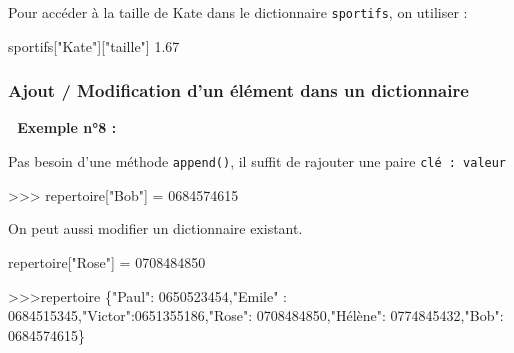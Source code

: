 \documentclass[
]{article}
\newenvironment{Shaded}{}{}
\newcommand{\FloatTok}[1]{\textcolor[rgb]{0.25,0.63,0.44}{#1}}
\newcommand{\NormalTok}[1]{#1}
\newcommand{\OperatorTok}[1]{\textcolor[rgb]{0.40,0.40,0.40}{#1}}
\newcommand{\StringTok}[1]{\textcolor[rgb]{0.25,0.44,0.63}{#1}}
\begin{document}
Pour accéder à la taille de Kate dans le dictionnaire \texttt{sportifs},
on utiliser :

\begin{Shaded}
\begin{Highlighting}[]
\NormalTok{sportifs[}\StringTok{"Kate"}\NormalTok{][}\StringTok{"taille"}\NormalTok{]}
\FloatTok{1.67}
\end{Highlighting}
\end{Shaded}

\hypertarget{ajout-modification-dun-uxe9luxe9ment-dans-un-dictionnaire}{%
\subsubsection{Ajout / Modification d'un élément dans un
dictionnaire}\label{ajout-modification-dun-uxe9luxe9ment-dans-un-dictionnaire}}

\textbf{📎 Exemple n°8 :}

Pas besoin d'une méthode \texttt{append()}, il suffit de rajouter une
paire \texttt{clé\ :\ valeur}

\begin{Shaded}
\begin{Highlighting}[]
\OperatorTok{\textgreater{}\textgreater{}\textgreater{}}\NormalTok{ repertoire[}\StringTok{"Bob"}\NormalTok{] }\OperatorTok{=} \StringTok{\textquotesingle{}0684574615\textquotesingle{}}
\end{Highlighting}
\end{Shaded}

On peut aussi modifier un dictionnaire existant.

\begin{Shaded}
\begin{Highlighting}[]
\NormalTok{repertoire[}\StringTok{"Rose"}\NormalTok{] }\OperatorTok{=} \StringTok{\textquotesingle{}0708484850\textquotesingle{}}
\end{Highlighting}
\end{Shaded}

\begin{Shaded}
\begin{Highlighting}[]
\OperatorTok{\textgreater{}\textgreater{}\textgreater{}}\NormalTok{repertoire}
\NormalTok{\{}\StringTok{"Paul"}\NormalTok{: }\StringTok{\textquotesingle{}0650523454\textquotesingle{}}\NormalTok{,}\StringTok{"Emile"}\NormalTok{ : }\StringTok{\textquotesingle{}0684515345\textquotesingle{}}\NormalTok{,}\StringTok{"Victor"}\NormalTok{:}\StringTok{\textquotesingle{}0651355186\textquotesingle{}}\NormalTok{,}\StringTok{"Rose"}\NormalTok{: }\StringTok{\textquotesingle{}0708484850\textquotesingle{}}\NormalTok{,}\StringTok{"Hélène"}\NormalTok{: }\StringTok{\textquotesingle{}0774845432\textquotesingle{}}\NormalTok{,}\StringTok{"Bob"}\NormalTok{: }\StringTok{\textquotesingle{}0684574615\textquotesingle{}}\NormalTok{\}}
\end{Highlighting}
\end{Shaded}
\end{document}
